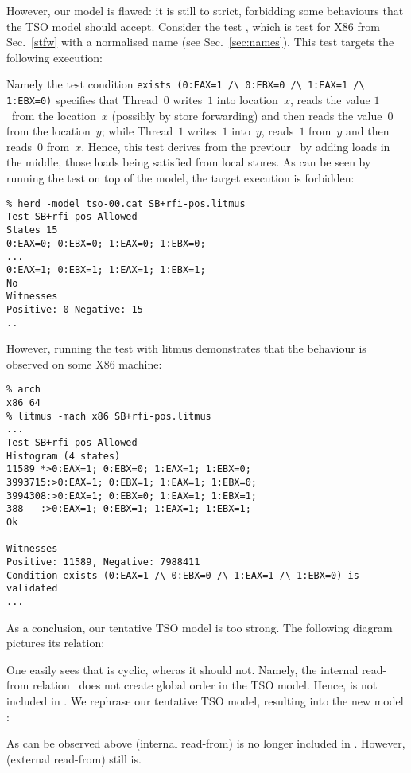 However,
our model  is flawed: it is still to strict,
forbidding some behaviours that the TSO model should accept.
Consider the test ,
which is test  for X86 from Sec.~\ref{stfw} with a normalised name (see Sec.~\ref{sec:names}).
This test targets the following execution:
\begin{center}\end{center}
Namely the test condition
\verb+exists (0:EAX=1 /\ 0:EBX=0 /\ 1:EAX=1 /\ 1:EBX=0)+
specifies that Thread~$0$ writes~$1$ into location~$x$,
reads the value $1$~from the location~$x$ (possibly by store forwarding) and
then reads the value~$0$ from the location~$y$;
while Thread~$1$ writes~$1$ into~$y$,
reads~$1$ from~$y$ and then reads~$0$ from~$x$.
Hence, this test derives from the previour~
by adding loads in the middle, those loads
being  satisfied from local stores.
As can be seen by running the test on top of the 
model, the target execution is forbidden:
\begin{verbatim}
% herd -model tso-00.cat SB+rfi-pos.litmus 
Test SB+rfi-pos Allowed
States 15
0:EAX=0; 0:EBX=0; 1:EAX=0; 1:EBX=0;
...
0:EAX=1; 0:EBX=1; 1:EAX=1; 1:EBX=1;
No
Witnesses
Positive: 0 Negative: 15
..
\end{verbatim}
However, running the test with litmus demonstrates that the behaviour
is observed on some X86 machine:
\begin{verbatim}
% arch
x86_64
% litmus -mach x86 SB+rfi-pos.litmus
...
Test SB+rfi-pos Allowed
Histogram (4 states)
11589 *>0:EAX=1; 0:EBX=0; 1:EAX=1; 1:EBX=0;
3993715:>0:EAX=1; 0:EBX=1; 1:EAX=1; 1:EBX=0;
3994308:>0:EAX=1; 0:EBX=0; 1:EAX=1; 1:EBX=1;
388   :>0:EAX=1; 0:EBX=1; 1:EAX=1; 1:EBX=1;
Ok

Witnesses
Positive: 11589, Negative: 7988411
Condition exists (0:EAX=1 /\ 0:EBX=0 /\ 1:EAX=1 /\ 1:EBX=0) is validated
...
\end{verbatim}
As a conclusion, our tentative TSO model is too strong.
The following diagram pictures its  relation:
\begin{center}\end{center}
One easily sees that  is cyclic, wheras it should not.
Namely, the internal read-from relation~ does
not create global order in the TSO model.
Hence,  is not included in .
We rephrase our tentative TSO model, resulting into the new model
:

As can be observed above  (internal read-from) is no longer
included in . However,  (external read-from)
still is.

